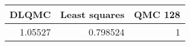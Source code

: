 \begin{tabular}{rrr}
\toprule
   DLQMC &   Least squares &   QMC 128 \\
\midrule
 1.05527 &        0.798524 &         1 \\
\bottomrule
\end{tabular}
